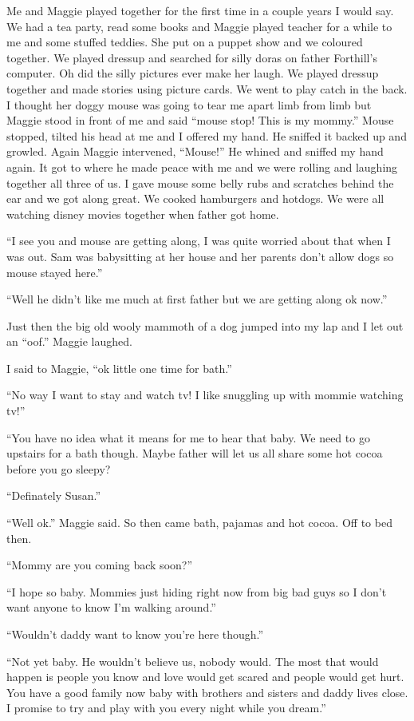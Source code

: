 Me and Maggie played together for the first time in a couple years I would say. We had a tea party, read some books and Maggie played teacher for a while to me and some stuffed teddies. She put on a puppet show and we coloured together. We played dressup and searched for silly doras on father Forthill's computer. Oh did the silly pictures ever make her laugh. We played dressup together and made stories using picture cards. We went to play catch in the back. I thought her doggy mouse was going to tear me apart limb from limb but Maggie stood in front of me and said ``mouse stop! This is my mommy.'' Mouse stopped, tilted his head at me and I offered my hand. He sniffed it backed up and growled. Again Maggie intervened, ``Mouse!'' He whined and sniffed my hand again. It got to where he made peace with me and we were rolling and laughing together all three of us. I gave mouse some belly rubs and scratches behind the ear and we got along great. We cooked hamburgers and hotdogs. We were all watching disney movies together when father got home. 

``I see you and mouse are getting along, I was quite worried about that when I was out. Sam was babysitting at her house and her parents don't allow dogs so mouse stayed here.'' 

``Well he didn't like me much at first father but we are getting along ok now.'' 

Just then the big old wooly mammoth of a dog jumped into my lap and I let out an ``oof.'' Maggie laughed. 

I said to Maggie, ``ok little one time for bath.'' 

``No way I want to stay and watch tv! I like snuggling up with mommie watching tv!'' 

``You have no idea what it means for me to hear that baby. We need to go upstairs for a bath though. Maybe father will let us all share some hot cocoa before you go sleepy? 

``Definately Susan.'' 

``Well ok.'' Maggie said. So then came bath, pajamas and hot cocoa. Off to bed then.

``Mommy are you coming back soon?''

``I hope so baby. Mommies just hiding right now from big bad guys so I don't want anyone to know I'm walking around.''

``Wouldn't daddy want to know you're here though.''

``Not yet baby. He wouldn't believe us, nobody would. The most that would happen is people you know and love would get scared and people would get hurt. You have a good family now baby with brothers and sisters and daddy lives close. I promise to try and play with you every night while you dream.''

